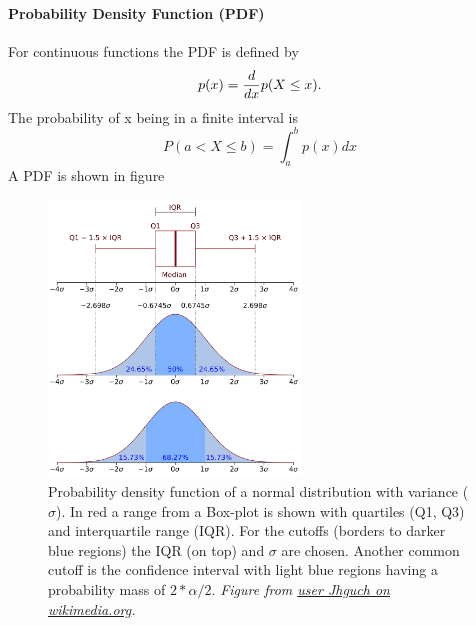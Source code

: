 \documentclass[../main.tex]{subfiles}
\begin{document}
\paragraph{Probability Density Function (PDF)}  For continuous functions the PDF is defined by 
        \begin{equation}
            p(x) =  {d \over dx} p(X \leq x).
        \end{equation}
        The probability of x being in a finite interval is
        \begin{equation}
            P(a < X \leq b) = \int_a^b p(x) dx
        \end{equation}
        A PDF is shown in figure
        \begin{figure}
            \centering
            \includegraphics[width=0.6\textwidth]{../figures/Boxplot_vs_PDF.png}
            \caption{Probability density function of a normal distribution with variance ($\sigma$). In red a range from a Box-plot is shown with quartiles (Q1, Q3) and interquartile range (IQR). For the cutoffs (borders to darker blue regions) the IQR (on top) and $\sigma$ are chosen. Another common cutoff is the confidence interval with light blue regions having a probability mass of $2 * \alpha / 2$. \textit{Figure from \href{https://commons.wikimedia.org/wiki/File:Boxplot_vs_PDF.svg}{user Jhguch on wikimedia.org}.}}
            \label{CDF}
        \end{figure}
\end{document}
